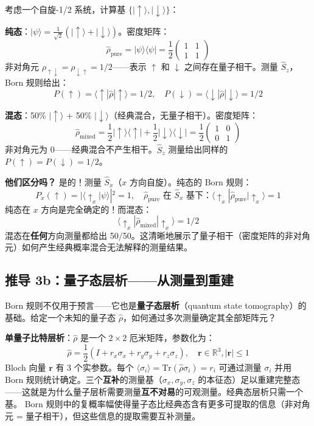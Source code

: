 \begin{notebox}[纯态 vs 混态——一个具体例子]
考虑一个自旋-1/2 系统，计算基 $\{|\!\uparrow\rangle, |\!\downarrow\rangle\}$：

\textbf{纯态}：$|\psi\rangle = \frac{1}{\sqrt{2}}(|\!\uparrow\rangle + |\!\downarrow\rangle)$。密度矩阵：
\[
\hat{\rho}_{\text{pure}} = |\psi\rangle\langle\psi| = \frac{1}{2}\begin{pmatrix}1 & 1 \\ 1 & 1\end{pmatrix}
\]
非对角元 $\rho_{\uparrow\downarrow} = \rho_{\downarrow\uparrow} = 1/2$——表示 $\uparrow$ 和 $\downarrow$ 之间存在量子相干。测量 $\hat{S}_z$，Born 规则给出：
\[
P(\!\uparrow) = \langle\uparrow\!|\hat{\rho}|\!\uparrow\rangle = 1/2, \quad P(\!\downarrow) = \langle\downarrow\!|\hat{\rho}|\!\downarrow\rangle = 1/2
\]

\textbf{混态}：50\% $|\!\uparrow\rangle$ + 50\% $|\!\downarrow\rangle$（经典混合，无量子相干）。密度矩阵：
\[
\hat{\rho}_{\text{mixed}} = \frac{1}{2}|\!\uparrow\rangle\langle\uparrow\!| + \frac{1}{2}|\!\downarrow\rangle\langle\downarrow\!| = \frac{1}{2}\begin{pmatrix}1 & 0 \\ 0 & 1\end{pmatrix}
\]
非对角元为 0——经典混合不产生相干。$\hat{S}_z$ 测量给出同样的 $P(\!\uparrow)=P(\!\downarrow)=1/2$。

\textbf{他们区分吗？} 是的！测量 $\hat{S}_x$（$x$ 方向自旋）。纯态的 Born 规则：
\[
P_x(\!\uparrow) = |\langle \uparrow_x\!|\psi\rangle|^2 = 1, \quad \hat{\rho}_{\text{pure}} \text{ 在 } \hat{S}_x \text{ 基下：}\langle \uparrow_x\!|\hat{\rho}_{\text{pure}}|\!\uparrow_x\rangle = 1
\]
纯态在 $x$ 方向是完全确定的！而混态：
\[
\langle \uparrow_x\!|\hat{\rho}_{\text{mixed}}|\!\uparrow_x\rangle = 1/2
\]
混态在\textbf{任何}方向测量都给出 50/50。这清晰地展示了量子相干（密度矩阵的非对角元）如何产生经典概率混合无法解释的测量结果。
\end{notebox}

\subsection{推导 3b：量子态层析——从测量到重建}

Born 规则不仅用于预言——它也是\textbf{量子态层析}（quantum state tomography）的基础。给定一个未知的量子态 $\hat{\rho}$，如何通过多次测量确定其全部矩阵元？

\textbf{单量子比特层析}：$\hat{\rho}$ 是一个 $2\times2$ 厄米矩阵，参数化为：
\[
\hat{\rho} = \frac{1}{2}(I + r_x\sigma_x + r_y\sigma_y + r_z\sigma_z), \quad \mathbf{r} \in \mathbb{R}^3, |\mathbf{r}| \le 1
\]
Bloch 向量 $\mathbf{r}$ 有 3 个实参数。每个 $\langle\sigma_i\rangle = \text{Tr}(\hat{\rho}\sigma_i) = r_i$ 可通过测量 $\sigma_i$ 并用 Born 规则统计确定。三个\textbf{互补}的测量基（$\sigma_x, \sigma_y, \sigma_z$ 的本征态）足以重建完整态——这就是为什么量子层析需要测量\textbf{互不对易}的可观测量。经典态层析只需一个基。\fbox{[S]} Born 规则中的复概率幅使得量子态比经典态含有更多可提取的信息（非对角元 = 量子相干），但这些信息的提取需要互补测量。


